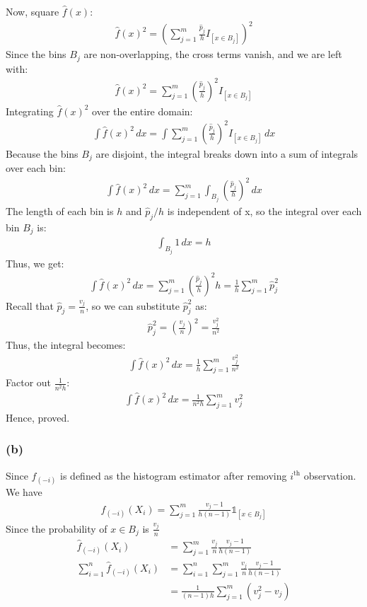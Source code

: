 Now, square \( \hat{f}(x) \):
\begin{align}
	\hat{f}(x)^2 = \left( \sum_{j=1}^{m} \frac{\hat{p}_j}{h} I_{[x \in B_j]} \right)^2
\end{align}
Since the bins \( B_j \) are non-overlapping, the cross terms vanish, and we
are left with:
\begin{align}
	\hat{f}(x)^2 = \sum_{j=1}^{m} \left( \frac{\hat{p}_j}{h} \right)^2 I_{[x \in B_j]}
\end{align}
Integrating \( \hat{f}(x)^2 \) over the entire domain:
\begin{align}
	\int \hat{f}(x)^2 \, dx = \int \sum_{j=1}^{m} \left( \frac{\hat{p}_j}{h} \right)^2 I_{[x \in B_j]} \, dx
\end{align}
Because the bins \( B_j \) are disjoint, the integral breaks down into a sum of
integrals over each bin:
\begin{align}
	\int \hat{f}(x)^2 \, dx = \sum_{j=1}^{m} \int_{B_j} \left( \frac{\hat{p}_j}{h} \right)^2 \, dx
\end{align}
The length of each bin is  $h$ and $ \hat{p}_{j}/h $ is independent of x, so
the integral over each bin $B_j$  is:
\begin{align}
	\int_{B_j} 1 \, dx = h
\end{align}
Thus, we get:
\begin{align}
	\int \hat{f}(x)^2 \, dx = \sum_{j=1}^{m} \left( \frac{\hat{p}_j}{h} \right)^2 h = \frac{1}{h} \sum_{j=1}^{m} \hat{p}_j^2
\end{align}
Recall that \( \hat{p}_j = \frac{v_j}{n} \), so we can substitute \( \hat{p}_j^2 \) as:
\begin{align}
	\hat{p}_j^2 = \left( \frac{v_j}{n} \right)^2 = \frac{v_j^2}{n^2}
\end{align}
Thus, the integral becomes:
\begin{align}
	\int \hat{f}(x)^2 \, dx = \frac{1}{h} \sum_{j=1}^{m} \frac{v_j^2}{n^2}
\end{align}
Factor out \( \frac{1}{n^2 h} \):
\begin{align}
	\int \hat{f}(x)^2 \, dx = \frac{1}{n^2 h} \sum_{j=1}^{m} v_j^2
\end{align}
Hence, proved.

\subsubsection{(b)}
Since $\hat{f}_{(-i)}$ is defined as the histogram estimator after removing $i^\text{th}$ observation. 
We have
\begin{align}
	\hat{f}_{(-i)}(X_i) = \sum_{j=1}^{m} \frac{v_j-1}{h(n-1)} \mathbb{1}_{[x \in B_j]}
\end{align}
Since the probability of $x\in B_j$ is $\frac{v_j}{n}$
\begin{align}
	\hat{f}_{(-i)}(X_i)             & = \sum_{j=1}^{m} \frac{v_j}{n} \frac{v_j-1}{h(n-1)}             \\
	\sum_{i=1}^n\hat{f}_{(-i)}(X_i) & =\sum_{i=1}^n \sum_{j=1}^{m} \frac{v_j}{n} \frac{v_j-1}{h(n-1)} \\
	                                & = \frac{1}{(n-1)h}\sum_{j=1}^m (v_j^2 - v_j)
\end{align}

